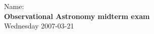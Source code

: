 \documentclass[12pt]{article}
\begin{document}
\noindent
Name:\,\makebox[0.8\textwidth]{\hrulefill} \\
\textbf{Observational Astronomy midterm exam} \\
Wednesday 2007-03-21 \\
\end{document}
